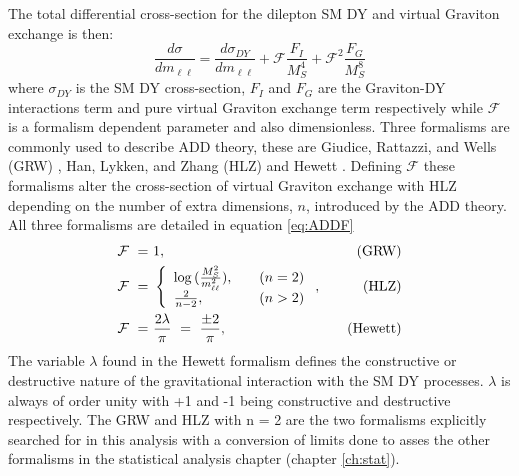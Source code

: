         The total differential cross-section for the dilepton SM DY and virtual Graviton exchange is then:
        \begin{equation}
            \frac{d\sigma}{dm_{\ell\ell}} =
                \frac{d\sigma_{DY}}{dm_{\ell\ell}} +
                \mathcal{F}\frac{F_{I}}{M_{S}^{4}} +
                \mathcal{F}^{2}\frac{F_{G}}{M_{S}^{8}}
            \label{eq:ADDcs}
        \end{equation}
        where $\sigma_{DY}$ is the SM DY cross-section, $F_{I}$ and $F_{G}$ are the Graviton-DY interactions term and pure virtual Graviton exchange term respectively while $\mathcal{F}$ is a formalism dependent parameter and also dimensionless. 
        Three formalisms are commonly used to describe ADD theory, these are Giudice, Rattazzi, and Wells (GRW) \cite{Giudice:1998ck}, Han, Lykken, and Zhang (HLZ) \cite{PhysRevD.59.105006} and Hewett \cite{PhysRevLett.82.4765}. Defining $\mathcal{F}$ these formalisms alter the cross-section of virtual Graviton exchange with HLZ depending on the number of extra dimensions, $n$, introduced by the ADD theory. All three formalisms are detailed in equation \ref{eq:ADDF}
        \begin{equation}
            \begin{aligned}
                \mathcal{F}~=&~1,   \quad &\text{(GRW)} \\
                \mathcal{F}~=&~  \left\{ 
                    \begin{array}{l l}
                        \log{(\frac{M_{S}^{2}}{m_{\ell\ell}^{2}})},      \quad & (n = 2) \\
                        \frac{2}{n-2},                                   \quad & (n > 2)
                    \end{array} \right.,  \quad &\text{(HLZ)}  \\
                \mathcal{F}~=&~\frac{2\lambda}{\pi}~=~\frac{\pm2}{\pi},     \quad &\text{(Hewett)}
            \end{aligned}
            \label{eq:ADDF}
        \end{equation}
        The variable $\lambda$ found in the Hewett formalism defines the constructive or destructive nature of the gravitational interaction with the SM DY processes. $\lambda$ is always of order unity with +1 and -1 being constructive and destructive respectively.
        The GRW and HLZ with n = 2 are the two formalisms explicitly searched for in this analysis with a conversion of limits done to asses the other formalisms in the statistical analysis chapter (chapter \ref{ch:stat}).

